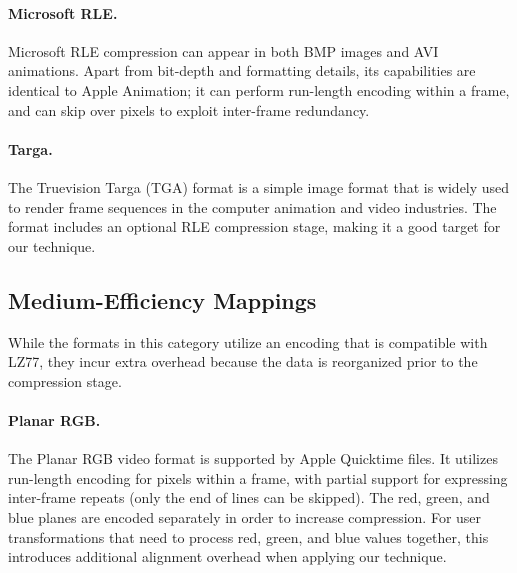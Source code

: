 \paragraph{Microsoft RLE.}
Microsoft RLE compression can appear in both BMP images and AVI
animations.  Apart from bit-depth and formatting details, its
capabilities are identical to Apple Animation; it can perform
run-length encoding within a frame, and can skip over pixels to
exploit inter-frame redundancy.

\paragraph{Targa.}
The Truevision Targa (TGA) format is a simple image format that is
widely used to render frame sequences in the computer animation and
video industries.  The format includes an optional RLE compression
stage, making it a good target for our technique.


\subsection{Medium-Efficiency Mappings}
\label{sec:formats-med}

While the formats in this category utilize an encoding that is
compatible with LZ77, they incur extra overhead because the data is
reorganized prior to the compression stage.

\paragraph{Planar RGB.}
The Planar RGB video format is supported by Apple Quicktime files.  It
utilizes run-length encoding for pixels within a frame, with partial
support for expressing inter-frame repeats (only the end of lines can
be skipped).  The red, green, and blue planes are encoded separately
in order to increase compression.  For user transformations that need
to process red, green, and blue values together, this introduces
additional alignment overhead when applying our technique.

